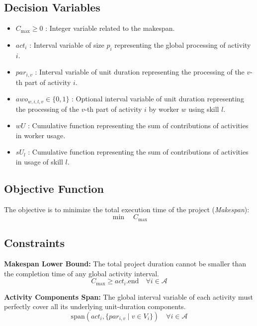 \documentclass[preprint, authoryear,11pt]{elsarticle}
\begin{document}
\subsection{Decision Variables}
\begin{itemize}
    \item $C_{\max} \ge 0$ : Integer variable related to the makespan.
    \item $act_i$ : Interval variable of size $p_i$ representing the global processing of activity $i$.
    \item $par_{i,v}$ : Interval variable of unit duration representing the processing of the $v$-th part of activity $i$.
    \item $awo_{w,i,l,v} \in \{0, 1\}$ : Optional interval variable of unit duration representing the processing of the $v$-th part of activity $i$ by worker $w$ using skill $l$.
    \item $wU$ : Cumulative function representing the sum of contributions of activities in worker usage.
    \item $sU_l$ : Cumulative function representing the sum of contributions of activities in usage of skill $l$.
\end{itemize}

\subsection{Objective Function}
The objective is to minimize the total execution time of the project (\textit{Makespan}):
\begin{equation}
    \min \quad C_{\max}
\end{equation}

\subsection{Constraints}

\noindent \textbf{Makespan Lower Bound:} The total project duration cannot be smaller than the completion time of any global activity interval.
\begin{equation}
    C_{\max} \geq act_i.\text{end} \quad \forall i \in \mathcal{A}
\end{equation}

\noindent \textbf{Activity Components Span:} The global interval variable of each activity must perfectly cover all its underlying unit-duration components.
\begin{equation}
    \text{span}(act_i, \{par_{i,v} \mid v \in V_i\}) \quad \forall i \in \mathcal{A}
\end{equation}
\end{document}

